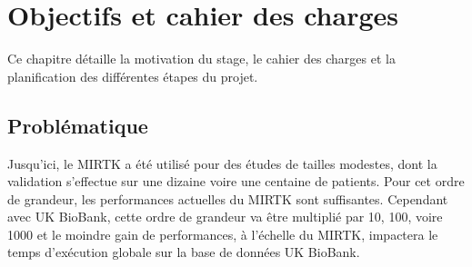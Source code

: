 \documentclass[10pt]{report}
\begin{document}
	 
	 
\chapter{Objectifs et cahier des charges}
	Ce chapitre détaille la motivation du stage, le cahier des charges et la planification des différentes étapes du projet.
	\section{Problématique} 
	Jusqu'ici, le MIRTK a été utilisé pour des études de tailles modestes, dont la validation s'effectue sur une dizaine voire une centaine de patients. Pour cet ordre de grandeur, les performances actuelles du MIRTK sont suffisantes. Cependant avec UK BioBank, cette ordre de grandeur va être multiplié par 10, 100, voire 1000 et le moindre gain de performances, à l'échelle du MIRTK, impactera le temps d'exécution globale sur la base de données UK BioBank.\\ ~\par
	
\end{document}

